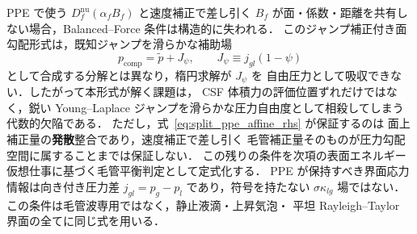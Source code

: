 PPE で使う $D_f^{\mathrm{nu}}(\alpha_fB_f)$ と速度補正で差し引く
$B_f$ が面・係数・距離を共有しない場合，Balanced--Force 条件は構造的に失われる．
このジャンプ補正付き面勾配形式は，既知ジャンプを滑らかな補助場
\begin{equation}
  p_\mathrm{comp}=\tilde p + J_\psi,
  \qquad
  J_\psi \equiv j_{gl}(1-\psi)
  \label{eq:split_ppe_smooth_lift_composition}
\end{equation}
として合成する分解とは異なり，楕円求解が $J_\psi$ を
自由圧力として吸収できない．したがって本形式が解く課題は，
CSF 体積力の評価位置ずれだけではなく，鋭い Young--Laplace
ジャンプを滑らかな圧力自由度として相殺してしまう代数的欠陥である．
ただし，式~\eqref{eq:split_ppe_affine_rhs} が保証するのは
面上補正量の\textbf{発散}整合であり，速度補正で差し引く
毛管補正量そのものが圧力勾配空間に属することまでは保証しない．
この残りの条件を次項の表面エネルギー仮想仕事に基づく毛管平衡判定として定式化する．
PPE が保持すべき界面応力情報は向き付き圧力差
$j_{gl}=p_g-p_l$ であり，符号を持たない $\sigma\kappa_{lg}$ 場ではない．
この条件は毛管波専用ではなく，静止液滴・上昇気泡・
平坦 Rayleigh--Taylor 界面の全てに同じ式を用いる．

